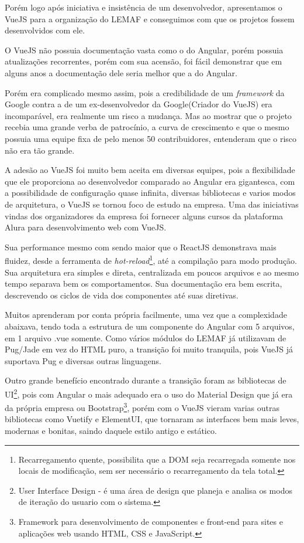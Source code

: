 Porém logo após iniciativa e insistência de um desenvolvedor, apresentamos o VueJS para a organização do LEMAF e conseguimos com que os projetos fossem desenvolvidos com ele.

O VueJS não possuia documentação vasta como o do Angular, porém possuia atualizações recorrentes, porém com sua acensão, foi fácil demonstrar que em alguns anos a documentação dele seria melhor que a do Angular.

Porém era complicado mesmo assim, pois a credibilidade de um \textit{framework} da Google contra a de um ex-desenvolvedor da Google(Criador do VueJS) era incomparável, era realmente um risco a mudança. 
Mas ao mostrar que o projeto recebia uma grande verba de patrocínio, a curva de crescimento e que o mesmo possuia uma equipe fixa de pelo menos 50 contribuidores, entenderam que o risco não era tão grande.

A adesão ao VueJS foi muito bem aceita em diversas equipes, pois a flexibilidade que ele proporciona ao desenvolvedor comparado ao Angular era gigantesca, com a possibilidade de configuração quase infinita, diversas bibliotecas e varios modos de arquitetura, o VueJS se tornou foco de estudo na empresa.
Uma das iniciativas vindas dos organizadores da empresa foi fornecer alguns cursos da plataforma Alura para desenvolvimento web com VueJS.

Sua performance mesmo com sendo maior que o ReactJS demonstrava mais fluidez, desde a ferramenta de \textit{hot-reload}\footnote{Recarregamento quente, possibilita que a DOM seja recarregada somente nos locais de modificação, sem ser necessário o recarregamento da tela total.}, até a compilação para modo produção.
Sua arquitetura era simples e direta, centralizada em poucos arquivos e ao mesmo tempo separava bem os comportamentos. Sua documentação era bem escrita, descrevendo os ciclos de vida dos componentes até suas diretivas.

Muitos aprenderam por conta própria facilmente, uma vez que a complexidade abaixava, tendo toda a estrutura de um componente do Angular com 5 arquivos, em 1 arquivo .vue somente.
Como vários módulos do LEMAF já utilizavam de Pug/Jade em vez do HTML puro, a transição foi muito tranquila, pois VueJS já suportava Pug e diversas outras linguagens.

Outro grande benefício encontrado durante a transição foram as bibliotecas de UI\footnote{User Interface Design - é uma área de design que planeja e analisa os modos de iteração do usuario com o sistema.}, pois com Angular o mais adequado era o uso do Material Design que já era da própria empresa ou 
Bootstrap\footnote{Framework para desenvolvimento de componentes e front-end para sites e aplicações web usando HTML, CSS e JavaScript.}, porém com o VueJS vieram varias outras bibliotecas como Vuetify e ElementUI, que tornaram as interfaces bem mais leves, modernas e bonitas, saindo daquele estilo antigo e estático.

